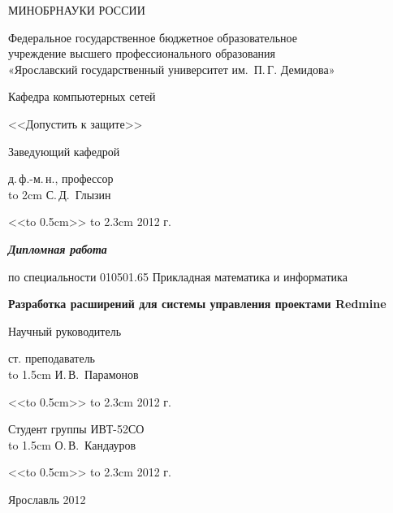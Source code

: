 \thispagestyle{empty}

\enlargethispage{2cm}
{
\renewcommand{\baselinestretch}{1.25}
\selectfont

\begin{center}
МИНОБРНАУКИ РОССИИ

Федеральное государственное бюджетное образовательное\\ учреждение
высшего профессионального образования\\
«Ярославский государственный университет им.~П.\,Г. Демидова»

Кафедра компьютерных сетей

\vspace{1.5cm}

\hfill\parbox{6.5cm}
{ 
<<Допустить к защите>>

Заведующий кафедрой

д.\,ф.-м.\,н., профессор \\
\hbox to 2cm{\hrulefill} С.\,Д.~Глызин

<<\hbox to 0.5cm{\hrulefill}>> \hbox to 2.3cm{\hrulefill} 2012 г.
}

\vspace{2.5cm}

{\bf \em Дипломная работа}
\par по специальности 010501.65 Прикладная математика и информатика



\vspace{0.5cm}

{ \large \bf \selectfont
Разработка расширений для системы управления проектами Redmine
}

\vspace{3cm}


\hfill\parbox{6.5cm}
{ 
Научный руководитель

ст. преподаватель\\
\hbox to 1.5cm{\hrulefill} И.\,В.~Парамонов

<<\hbox to 0.5cm{\hrulefill}>> \hbox to 2.3cm{\hrulefill} 2012 г.
}

\vspace{1.5cm}

\hfill\parbox{6.5cm}
{ 
Студент группы ИВТ-52СО\\
\hbox to 1.5cm{\hrulefill} О.\,В.~Кандауров

<<\hbox to 0.5cm{\hrulefill}>> \hbox to 2.3cm{\hrulefill} 2012 г.
}

\vspace{4cm}

Ярославль 2012
 
\end{center}
}

\newpage

